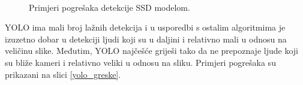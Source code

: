 \begin{figure}[H]
 \
 \
\caption{Primjeri pogrešaka detekcije SSD modelom.}
\label{ssd_greske}
\end{figure}

YOLO ima mali broj lažnih detekcija i u usporedbi s ostalim algoritmima je izuzetno dobar u detekciji ljudi koji su u daljini i relativno mali u odnosu na veličinu slike. Međutim, YOLO najčešće griješi tako da ne prepoznaje ljude koji su bliže kameri i relativno veliki u odnosu na sliku. Primjeri pogrešaka su prikazani na slici \ref{yolo_greske}.

